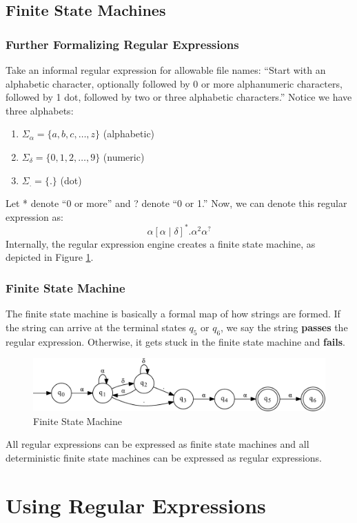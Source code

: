 \documentclass[aspectratio=169]{beamer}
\begin{document}
\subsection{Finite State Machines}
\begin{frame}
\frametitle{Further Formalizing Regular Expressions}
Take an informal regular expression for allowable file names: ``Start with an alphabetic character, optionally followed by 0 or more alphanumeric characters, followed by 1 dot, followed by two or three alphabetic characters.'' \pause Notice we have three alphabets:
\begin{enumerate}
	\item $\Sigma_\alpha = \{a, b, c, \dots, z\}$ (alphabetic)
	\item $\Sigma_\delta = \{0, 1, 2, \dots, 9\}$ (numeric)
	\item $\Sigma_. = \{ . \}$ (dot)
\end{enumerate}
\pause
Let * denote ``0 or more'' and ? denote ``0 or 1.'' Now, we can denote this regular expression as:
\[\alpha\left[\alpha \mid \delta \right]^* . \alpha^2 \alpha^?\]
Internally, the regular expression engine creates a finite state machine, as depicted in Figure \ref{fig:dfa}.
\end{frame}

\begin{frame}
\frametitle{Finite State Machine}
The finite state machine is basically a formal map of how strings are formed. If the string can arrive at the terminal states $q_5$ or $q_6$, we say the string \textbf{passes} the regular expression. Otherwise, it gets stuck in the finite state machine and \textbf{fails}.
\begin{figure}
\includegraphics[scale=0.55]{../artifacts/regexp-dfa.pdf}
\caption{Finite State Machine}
\label{fig:dfa}
\end{figure}
All regular expressions can be expressed as finite state machines and all deterministic finite state machines can be expressed as regular expressions.
\end{frame}

\section{Using Regular Expressions}
\end{document}
